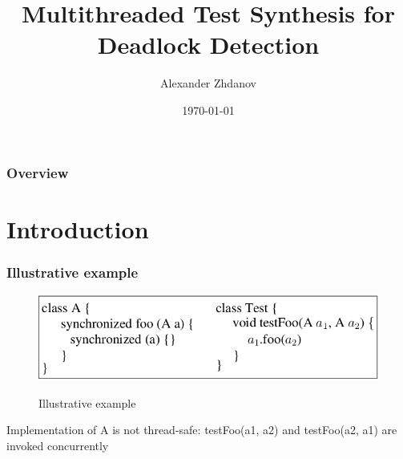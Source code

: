 \documentclass{beamer}
\title[multithreaded test synthesis]{Multithreaded Test Synthesis for Deadlock Detection} %
\author{Alexander Zhdanov} %
\institute[TUD.SOLA] %
{Technical University Darmstadt\\ Software Lab \\ %
\medskip
\textit{azhdanov@hotmail.com} %
}
\date{\today} %
\begin{document}
\begin{frame}
\titlepage %
\end{frame}

\begin{frame}
\frametitle{Overview} %
\tableofcontents %
\end{frame}


\section{Introduction} %

\begin{frame}
\frametitle{Illustrative example}
\begin{figure}
\includegraphics[scale = 0.5]{Images/Illustrative_example}\\
\caption{Illustrative example}
\end{figure}
Implementation of A is not thread-safe: testFoo(a1, a2) and testFoo(a2, a1) are invoked concurrently
\end{frame}


\end{document}
